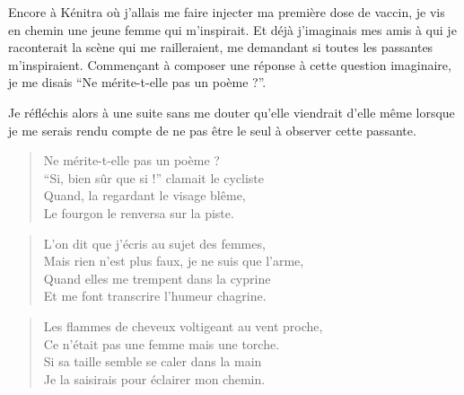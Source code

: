 \begin{prose}
  Encore à Kénitra où j’allais me faire injecter ma première dose de vaccin, je vis en  chemin une jeune femme qui m’inspirait. Et déjà j’imaginais mes amis à qui je raconterait la scène qui me railleraient, me demandant si toutes les passantes m’inspiraient. Commençant à composer une réponse à cette question imaginaire, je me disais \enquote{Ne mérite-t-elle pas un poème ?}.

  Je réfléchis alors à une  suite sans me douter qu’elle viendrait d’elle même lorsque je me serais rendu compte de ne pas être le seul à observer cette passante.
\end{prose}

\begin{verse}%
  \quatrain%
  Ne mérite-t-elle pas un poème ?\\  %
  \enquote{Si, bien sûr que si !} clamait le cycliste\\  %
  Quand, la regardant le visage blême,\\  %
  Le fourgon le renversa sur la piste.
\end{verse}


\begin{verse}%
  \quatrain%
  L’on dit que j’écris au sujet des femmes,\\  %
  Mais rien n’est plus faux, je ne suis que l’arme,\\  %
  Quand elles me trempent dans la cyprine\\  %
  Et me font transcrire l’humeur chagrine.
\end{verse}

\begin{verse}%
  \quatrain%
  Les flammes de cheveux voltigeant au vent proche,\\  %
  Ce n’était pas une femme mais une torche.\\  %
  Si sa taille semble se caler dans la main\\  %
  Je la saisirais pour éclairer mon chemin.
\end{verse}

